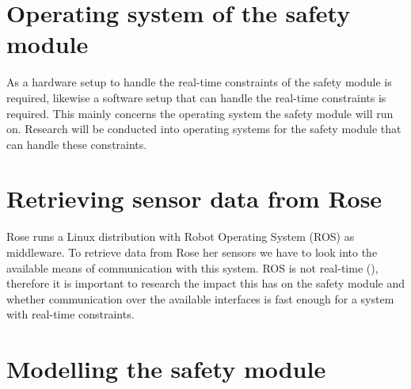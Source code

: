 \documentclass[12pt]{scrreprt}
\begin{document}
\section{Operating system of the safety module}
As a hardware setup to handle the real-time constraints of the safety module is required, likewise a software setup that can handle the real-time constraints is required. This mainly concerns the operating system the safety module will run on. Research will be conducted into operating systems for the safety module that can handle these constraints.


\section{Retrieving sensor data from Rose}
\label{Retrieving sensor data from Rose}
Rose runs a Linux distribution with Robot Operating System (ROS) as middleware. To retrieve data from Rose her sensors we have to look into the available means of communication with this system. ROS is not real-time (\cite{why_is_ros_not_realtime}), therefore it is important to research the impact this has on the safety module and whether communication over the available interfaces is fast enough for a system with real-time constraints. %

\section{Modelling the safety module}
\label{Modelling the safety module}
\end{document}
